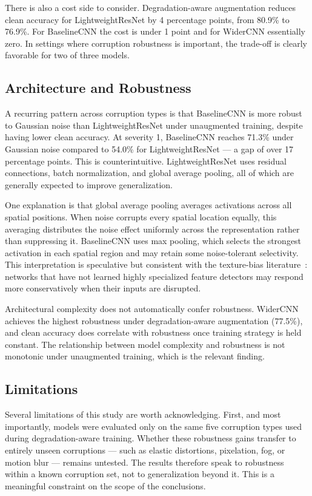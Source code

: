 \documentclass[conference]{IEEEtran}
\begin{document}
There is also a cost side to consider. Degradation-aware augmentation reduces clean accuracy for LightweightResNet by 4 percentage points, from 80.9\% to 76.9\%. For BaselineCNN the cost is under 1 point and for WiderCNN essentially zero. In settings where corruption robustness is important, the trade-off is clearly favorable for two of three models.

\subsection{Architecture and Robustness}

A recurring pattern across corruption types is that BaselineCNN is more robust to Gaussian noise than LightweightResNet under unaugmented training, despite having lower clean accuracy. At severity 1, BaselineCNN reaches 71.3\% under Gaussian noise compared to 54.0\% for LightweightResNet --- a gap of over 17 percentage points. This is counterintuitive. LightweightResNet uses residual connections, batch normalization, and global average pooling, all of which are generally expected to improve generalization.

One explanation is that global average pooling averages activations across all spatial positions. When noise corrupts every spatial location equally, this averaging distributes the noise effect uniformly across the representation rather than suppressing it. BaselineCNN uses max pooling, which selects the strongest activation in each spatial region and may retain some noise-tolerant selectivity. This interpretation is speculative but consistent with the texture-bias literature~\cite{geirhos2019}: networks that have not learned highly specialized feature detectors may respond more conservatively when their inputs are disrupted.

Architectural complexity does not automatically confer robustness. WiderCNN achieves the highest robustness under degradation-aware augmentation (77.5\%), and clean accuracy does correlate with robustness once training strategy is held constant. The relationship between model complexity and robustness is not monotonic under unaugmented training, which is the relevant finding.

\subsection{Limitations}

Several limitations of this study are worth acknowledging. First, and most importantly, models were evaluated only on the same five corruption types used during degradation-aware training. Whether these robustness gains transfer to entirely unseen corruptions --- such as elastic distortions, pixelation, fog, or motion blur --- remains untested. The results therefore speak to robustness within a known corruption set, not to generalization beyond it. This is a meaningful constraint on the scope of the conclusions.
\end{document}

